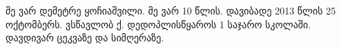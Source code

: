 მე ვარ დემეტრე ყოჩიაშვილი.
მე ვარ 10 წლის.
დავიბადე 2013 წლის 25 ოქტომბერს.
ვსწავლობ ქ. დედოპლისწყაროს 1 საჯარო სკოლაში.
დავდივარ ცეკვაზე და სიმღერაზე.
